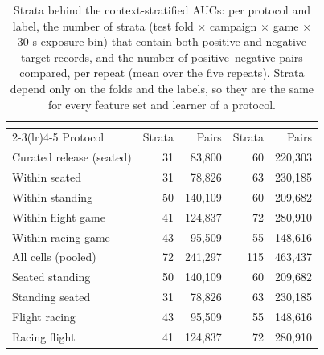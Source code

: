 \begin{table}[h]
\centering
\footnotesize
\caption{Strata behind the context-stratified AUCs: per protocol and label, the number of strata (test fold $\times$ campaign $\times$ game $\times$ 30-s exposure bin) that contain both positive and negative target records, and the number of positive--negative pairs compared, per repeat (mean over the five repeats). Strata depend only on the folds and the labels, so they are the same for every feature set and learner of a protocol.}
\label{tab:supp_strata}
\setlength{\tabcolsep}{5pt}
\begin{tabular}{@{}lrrrr@{}}
\toprule
 & \multicolumn{2}{c}{\sevtwo{}} & \multicolumn{2}{c}{\sevone{}} \\ \cmidrule(lr){2-3}\cmidrule(lr){4-5}
Protocol & Strata & Pairs & Strata & Pairs \\
\midrule
Curated release (seated) & 31 & 83,800 & 60 & 220,303 \\
Within seated & 31 & 78,826 & 63 & 230,185 \\
Within standing & 50 & 140,109 & 60 & 209,682 \\
Within flight game & 41 & 124,837 & 72 & 280,910 \\
Within racing game & 43 & 95,509 & 55 & 148,616 \\
All cells (pooled) & 72 & 241,297 & 115 & 463,437 \\
Seated \ra{} standing & 50 & 140,109 & 60 & 209,682 \\
Standing \ra{} seated & 31 & 78,826 & 63 & 230,185 \\
Flight \ra{} racing & 43 & 95,509 & 55 & 148,616 \\
Racing \ra{} flight & 41 & 124,837 & 72 & 280,910 \\
\bottomrule
\end{tabular}
\end{table}